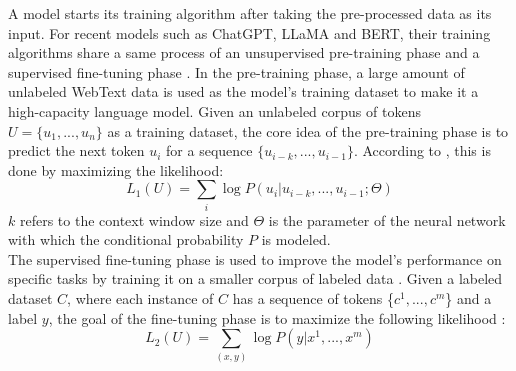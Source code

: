 \documentclass[runningheads]{llncs}
\begin{document}
\noindent \newline
A model starts its training algorithm after taking the pre-processed data as its input. For recent models such as ChatGPT, LLaMA and BERT, their training algorithms share a same process of an unsupervised pre-training phase and a supervised fine-tuning phase \cite{Roum23}.
In the pre-training phase, a large amount of unlabeled WebText data is used as the model's training dataset to make it a high-capacity language model. Given an unlabeled corpus of tokens $U=\{u_1,...,u_n\}$ as a training dataset, the core idea of the pre-training phase is to 
predict the next token $u_i$ for a sequence $\{u_{i-k},...,u_{i-1}\}$. According to \cite{Radford18}, this is done by maximizing the likelihood: 
\begin{equation}
  L_1(U) = \sum_{i}\log{P(u_i|u_{i-k},...,u_{i-1}; \Theta)}
\end{equation}
$k$ refers to the context window size and $\Theta$ is the parameter of the neural network with which the conditional probability $P$ is modeled. \\
\noindent \newline
The supervised fine-tuning phase is used to improve the model's performance on specific tasks by training it on a smaller corpus of labeled data \cite{Roum23}. Given a labeled dataset $C$,
where each instance of $C$ has a sequence of tokens \{$c^1,...,c^m$\} and a label $y$, the goal of the fine-tuning phase is to maximize the following likelihood \cite{Radford18}:
\begin{equation}
  L_2(U) = \sum_{(x,y)}\log{P(y|x^1,...,x^m)}
\end{equation}
\end{document}
